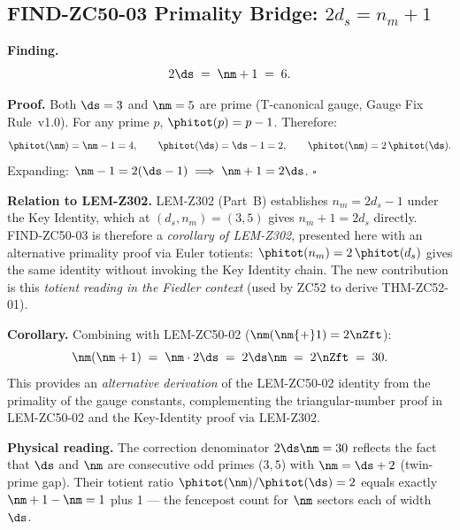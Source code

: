 \documentclass[12pt, a4paper]{article}
\begin{document}
\subsection{FIND-ZC50-03 \quad Primality Bridge: $2d_s = n_m+1$}


\begin{derivedbox}[title={FIND-ZC50-03: $2\ds = \nm+1 = 6$
  (Primality of Both Gauge Constants)}]
\textbf{Finding.}
\begin{equation}\label{zc51:eq:prim-bridge}
  2\ds \;=\; \nm + 1 \;=\; 6.
\end{equation}

\textbf{Proof.}
Both $\ds = 3$ and $\nm = 5$ are prime (T-canonical gauge,
Gauge Fix Rule~v1.0). For any prime $p$, $\phitot(p) = p-1$.
Therefore:
\[
  \phitot(\nm) = \nm - 1 = 4, \qquad
  \phitot(\ds) = \ds - 1 = 2, \qquad
  \phitot(\nm) = 2\,\phitot(\ds).
\]
Expanding: $\nm - 1 = 2(\ds - 1) \implies \nm + 1 = 2\ds$. \hfill$\square$

\textbf{Relation to LEM-Z302.}
LEM-Z302 (Part~B) establishes $n_m = 2d_s - 1$ under the Key Identity,
which at $(d_s,n_m)=(3,5)$ gives $n_m + 1 = 2d_s$ directly.
FIND-ZC50-03 is therefore a \emph{corollary of LEM-Z302},
presented here with an alternative primality proof via Euler totients:
$\phitot(n_m) = 2\,\phitot(d_s)$ gives the same identity
without invoking the Key Identity chain.
The new contribution is this \emph{totient reading in the Fiedler context}
(used by ZC52 to derive THM-ZC52-01).

\textbf{Corollary.}
Combining with LEM-ZC50-02 ($\nm(\nm{+}1) = 2\nZft$):
\[
  \nm(\nm+1) \;=\; \nm\cdot 2\ds \;=\; 2\ds\nm \;=\; 2\nZft \;=\; 30.
\]
This provides an \emph{alternative derivation} of the LEM-ZC50-02 identity
from the primality of the gauge constants, complementing the triangular-number
proof in LEM-ZC50-02 and the Key-Identity proof via LEM-Z302.

\textbf{Physical reading.}
The correction denominator $2\ds\nm = 30$ reflects the fact that
$\ds$ and $\nm$ are consecutive odd primes ($3, 5$) with
$\nm = \ds + 2$ (twin-prime gap). Their totient ratio
$\phitot(\nm)/\phitot(\ds) = 2$ equals exactly $\nm+1 - \nm = 1$
plus 1 — the fencepost count for $\nm$ sectors each of
width $\ds$.
\end{derivedbox}

\end{document}
